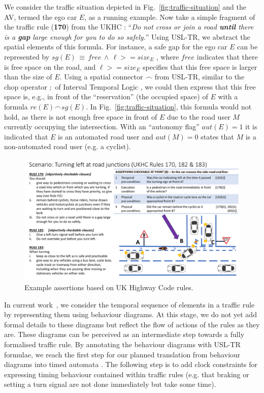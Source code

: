 \documentclass[runningheads,twocolumn,a4paper,10pt]{llncs}
\begin{document}
We consider the traffic situation depicted in Fig.~\ref{fig:traffic-situation} and the AV, termed the ego car $E$, as a running example. Now take a simple fragment of the traffic rule (\textbf{170}) from the UKHC \cite{departmentfortransportusing2017}:
``\textit{Do not cross or join a road \textbf{until} there is a \textbf{gap} large enough for you to do so safely.}''
Using USL-TR, we abstract the spatial elements of this formula. For instance, a safe gap for the ego car $E$ can be represented by $\mathit{sg}(E) \,\equiv\, \mathit{free} \,\land\, \ell >= \mathit{size}_E$
, where $\mathit{free}$ indicates that there is free space on the road, and $\ell >= \mathit{size}_E$ specifies that this free space is larger than the size of $E$. Using a spatial connector $\frown$ from USL-TR, similar to the chop operator $;$ of Interval Temporal Logic \cite{Mos85}, we could then express that this free space is, e.g., in front of the ``reservation'' (the occupied space) of $E$ with a formula $re (E) \frown \mathit{sg(E)}$. In Fig.~\ref{fig:traffic-situation}, this formula would not hold, as there is not enough free space in front of $E$ due to the road user $M$ currently occupying the intersection. With an ``autonomy flag'' $\mathit{aut}(E)=1$ it is indicated that $E$ is an automated road user and $\mathit{aut}(M)=0$ states that $M$ is a non-automated road user (e.g. a cyclist).

\begin{figure}[]
    \centering
    \includegraphics[width=0.85\linewidth]{Figures/UKHC_Rule_170_v3.jpg}
    \caption{Example assertions based on UK Highway Code rules.}
    \label{fig:UKHC-Rule-170}
\end{figure}

In current work~\cite{AS22}, we consider the temporal sequence of elements in a traffic rule by representing them using behaviour diagrams. At this stage, we do not yet add formal details to these diagrams but reflect the flow of actions of the rules as they are. These diagrams can be perceived as an intermediate step towards a fully formalised traffic rule. By annotating the behaviour diagrams with USL-TR formulae, we reach the first step for our planned translation from behaviour diagrams into timed automata \cite{AD94}. The following step is to add clock constraints for expressing timing behaviour contained within traffic rules (e.g. that braking or setting a turn signal are not done immediately but take some time).
\end{document}
